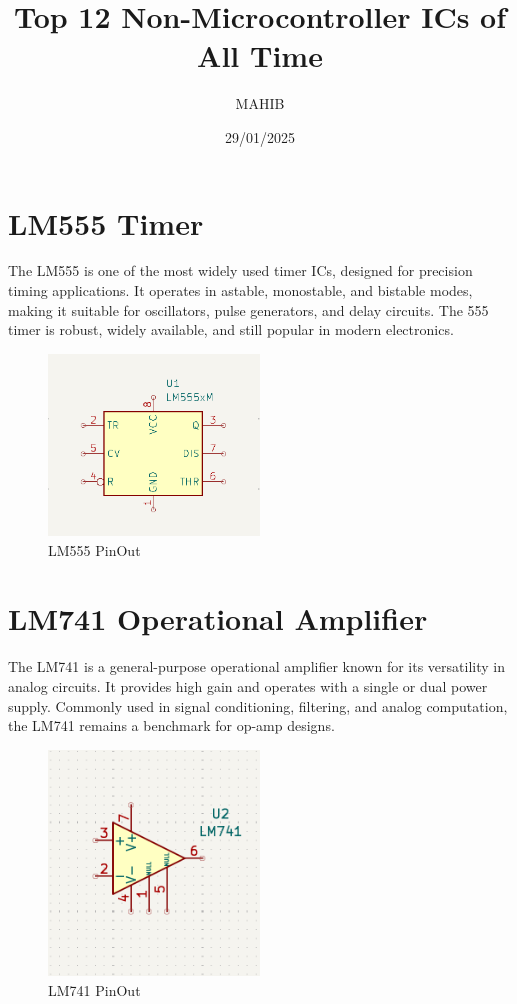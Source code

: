 \documentclass{article}
\begin{document}
\title{Top 12 Non-Microcontroller ICs of All Time}
\author{MAHIB}
\date{29/01/2025}
\maketitle

\section{LM555 Timer}
The LM555 is one of the most widely used timer ICs, designed for precision timing applications. It operates in astable, monostable, and bistable modes, making it suitable for oscillators, pulse generators, and delay circuits. The 555 timer is robust, widely available, and still popular in modern electronics.
\begin{figure}[H]
    \centering
    \includegraphics[width=0.5\textwidth]{img/LM555.png}
    \caption{LM555 PinOut}
    \label{fig:LM555}
\end{figure}

\section{LM741 Operational Amplifier}
The LM741 is a general-purpose operational amplifier known for its versatility in analog circuits. It provides high gain and operates with a single or dual power supply. Commonly used in signal conditioning, filtering, and analog computation, the LM741 remains a benchmark for op-amp designs.
\begin{figure}[H]
    \centering
    \includegraphics[width=0.5\textwidth]{img/LM741.png}
    \caption{LM741 PinOut}
    \label{fig:LM741}
\end{figure}
\end{document}
